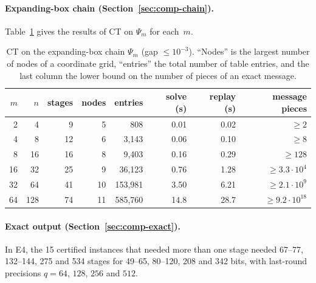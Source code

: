 \paragraph{Expanding-box chain (Section~\ref{sec:comp-chain}).}
Table~\ref{tab:chain} gives the results of CT on $\Psi_m$ for each~$m$.

\begin{table}[t]
\centering\small
\caption{CT on the expanding-box chain $\Psi_m$ (gap $\le10^{-3}$). ``Nodes'' is
the largest number of nodes of a coordinate grid, ``entries'' the total
number of table entries, and the last column the lower bound on the number of
pieces of an exact message.}\label{tab:chain}
\begin{tabular}{rrrrrrrr}
\toprule
$m$ & $n$ & stages & nodes & entries & solve (s) & replay (s) & message pieces\\
\midrule
2 & 4 & 9 & 5 & 808 & 0.01 & 0.02 & $\ge2$\\
4 & 8 & 12 & 6 & 3{,}143 & 0.06 & 0.10 & $\ge8$\\
8 & 16 & 16 & 8 & 9{,}403 & 0.16 & 0.29 & $\ge128$\\
16 & 32 & 25 & 9 & 36{,}123 & 0.76 & 1.28 & $\ge3.3\cdot10^4$\\
32 & 64 & 41 & 10 & 153{,}981 & 3.50 & 6.21 & $\ge2.1\cdot10^9$\\
64 & 128 & 74 & 11 & 585{,}760 & 14.8 & 28.7 & $\ge9.2\cdot10^{18}$\\
\bottomrule
\end{tabular}
\end{table}

\paragraph{Exact output (Section~\ref{sec:comp-exact}).}
In E4, the 15 certified instances that needed more than one stage needed
67--77, 132--144, 275 and 534 stages for 49--65, 80--120, 208 and 342 bits,
with last-round precisions $q=64$, $128$, $256$ and $512$.

